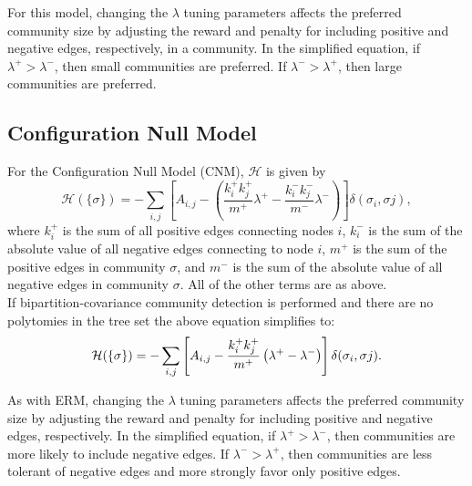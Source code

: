 \documentclass[11pt]{article}
\begin{document}
For this model, changing the $\lambda$ tuning parameters affects the preferred community size by
adjusting the reward and penalty for including positive and negative edges, respectively, in a
community. In the simplified equation, if $\lambda^{+} > \lambda^{-}$, then small communities are preferred. If $\lambda^{-} > \lambda^{+}$, then large communities are preferred. \\


\subsection{Configuration Null Model}\label{appendix:CNModel}

For the Configuration Null Model (CNM), $\mathcal{H}$ is given by
\begin{equation}\label{eq:CNModel1}
\mathcal{H}(\{\sigma\}) = - \displaystyle\sum_{i,j} \left[A_{i,j} -  \left(\frac{k_{i}^{+} k_{j}^{+}}{m^{+}} \lambda^{+} - \frac{k_{i}^{-} k_{j}^{-}}{m^{-}} \lambda^{-}\right)\right]\delta(\sigma_{i}, \sigma{j}),
\end{equation}
where $k_{i}^{+}$ is the sum of all positive edges connecting nodes $i$, $k_{i}^{-}$ is the sum of the absolute value of all negative edges connecting to node $i$, $m^{+}$ is the sum of the positive edges in community $\sigma$, and $m^{-}$ is the sum of the absolute value of all negative edges in community $\sigma$. All of the other terms are as above. \\


If bipartition-covariance community detection is performed and there are no polytomies in
the tree set the above equation simplifies to:
\begin{equation}\label{eq:CNModel2}
\mathcal{H}(\{\sigma\}) = - \displaystyle\sum_{i,j} \left[A_{i,j} -  \frac{k_{i}^{+} k_{j}^{+}}{m^{+}} \left(\lambda^{+} - \lambda^{-}\right)\right]\delta(\sigma_{i}, \sigma{j}). \\
\end{equation}


As with ERM, changing the $\lambda$ tuning parameters affects the preferred community size by
adjusting the reward and penalty for including positive and negative edges, respectively. In
the simplified equation, if $\lambda^{+} > \lambda^{-}$, then communities are more likely to include negative edges. If $\lambda^{-} > \lambda^{+}$, then communities are less tolerant of negative edges and more strongly favor only positive edges. \\
\end{document}
